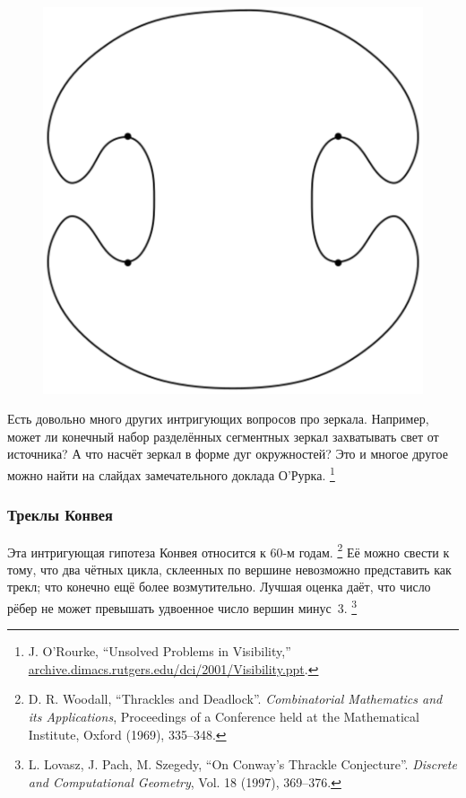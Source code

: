 \begin{figure}[h!]
\centering
\includegraphics[scale=0.5]{Figs/UnsolvedPuzzles/klee}
\end{figure} 

Есть довольно много других интригующих вопросов про зеркала.
Например, может ли конечный набор разделённых сегментных зеркал захватывать свет от источника?
А что насчёт зеркал в форме дуг окружностей?
Это и многое другое можно найти на слайдах замечательного доклада О’Рурка.%
\footnote{J. O'Rourke, ``Unsolved Problems in Visibility,''
\href{http://archive.dimacs.rutgers.edu/dci/2001/Visibility.ppt}{\url{archive.dimacs.rutgers.edu/dci/2001/Visibility.ppt}}.}

\subsubsection*{Треклы Конвея}

Эта интригующая гипотеза Конвея относится к 60-м годам.%
\footnote{D. R. Woodall, ``Thrackles and Deadlock''. \emph{Combinatorial Mathematics and its Applications}, Proceedings of a Conference held at the Mathematical Institute, Oxford (1969), 335--348.}
Её можно свести к тому, что два чётных цикла, склеенных по вершине невозможно представить как трекл;
что конечно ещё более возмутительно.
Лучшая оценка даёт, что число рёбер не может превышать удвоенное число вершин минус~3.%
\footnote{L. Lovasz, J. Pach, M. Szegedy, ``On Conway's Thrackle Conjecture''. \emph{Discrete and Computational Geometry}, Vol. 18 (1997), 369--376.}

